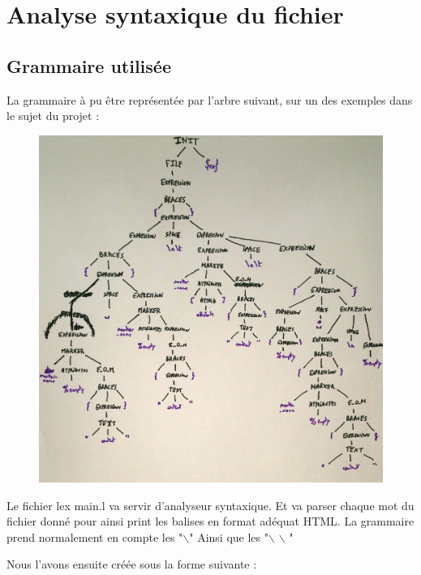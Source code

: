 \chapter{Analyse syntaxique du fichier }

\section{Grammaire utilisée}

La grammaire à pu être représentée par l'arbre suivant, sur un des exemples dans le sujet du projet : 
\begin{figure}[H]
\centering
\includegraphics[scale=0.25]{Arbre.jpg}
\caption{}
\end{figure}

Le fichier lex main.l va servir d'analyseur syntaxique. Et va parser chaque mot du fichier donné pour ainsi print les balises en format adéquat HTML.\newline
La grammaire prend normalement en compte les "$\backslash$" Ainsi que les "$\backslash$ $\backslash$ " \newline
\newline


Nous l'avons ensuite créée sous la forme suivante :\newline
\newline

